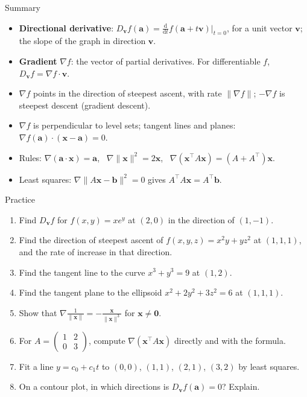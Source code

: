 \documentclass[10pt]{wosm-slides}
\newcommand{\norm}[1]{\lVert #1 \rVert}
\newcommand{\vx}{\mathbf{x}}
\newcommand{\va}{\mathbf{a}}
\newcommand{\vb}{\mathbf{b}}
\DeclareRobustCommand{\vv}{\mathbf{v}}
\begin{document}
\begin{frame}{Summary}
  \begin{itemize}
    \item \textbf{Directional derivative}: $D_\vv f(\va) = \frac{\mathrm d}{\mathrm dt} f(\va + t\vv)|_{t=0}$,
      for a unit vector $\vv$; the slope of the graph in direction $\vv$.
    \item \textbf{Gradient} $\nabla f$: the vector of partial derivatives. For differentiable $f$,
      $D_\vv f = \nabla f \cdot \vv$.
    \item $\nabla f$ points in the direction of steepest ascent, with rate $\norm{\nabla f}$;
      $-\nabla f$ is steepest descent (gradient descent).
    \item $\nabla f$ is perpendicular to level sets; tangent lines and planes:
      $\nabla f(\va) \cdot (\vx - \va) = 0$.
    \item Rules: $\nabla(\va \cdot \vx) = \va$, \ $\nabla \norm{\vx}^2 = 2\vx$, \
      $\nabla(\vx^\top A \vx) = (A + A^\top)\vx$.
    \item Least squares: $\nabla \norm{A\vx - \vb}^2 = 0$ gives $A^\top A\vx = A^\top \vb$.
  \end{itemize}
\end{frame}

\begin{frame}{Practice}
  \small
  \begin{enumerate}
    \item Find $D_\vv f$ for $f(x, y) = x e^y$ at $(2, 0)$ in the direction of $(1, -1)$.
    \item Find the direction of steepest ascent of $f(x, y, z) = x^2 y + y z^2$ at $(1, 1, 1)$,
      and the rate of increase in that direction.
    \item Find the tangent line to the curve $x^3 + y^3 = 9$ at $(1, 2)$.
    \item Find the tangent plane to the ellipsoid $x^2 + 2y^2 + 3z^2 = 6$ at $(1, 1, 1)$.
    \item Show that $\nabla \frac{1}{\norm{\vx}} = -\frac{\vx}{\norm{\vx}^3}$ for $\vx \ne \mathbf 0$.
    \item For $A = \begin{pmatrix} 1 & 2 \\ 0 & 3 \end{pmatrix}$, compute $\nabla(\vx^\top A\vx)$ directly
      and with the formula.
    \item Fit a line $y = c_0 + c_1 t$ to $(0, 0)$, $(1, 1)$, $(2, 1)$, $(3, 2)$ by least squares.
    \item On a contour plot, in which directions is $D_\vv f(\va) = 0$? Explain.
  \end{enumerate}
\end{frame}
\end{document}
